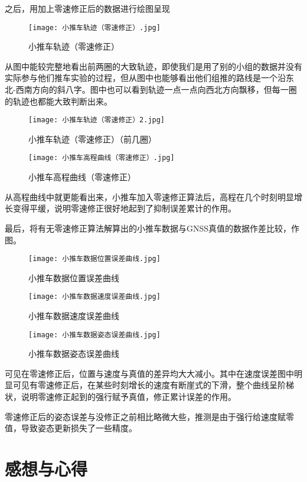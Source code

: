 \documentclass{ctexart}
\begin{document}
之后，用加上零速修正后的数据进行绘图呈现
\begin{figure}[H]
\texttt{[image: 小推车轨迹（零速修正）.jpg]}
\caption{小推车轨迹（零速修正）}
\end{figure}
从图中能较完整地看出前两圈的大致轨迹，即使我们是用了别的小组的数据并没有实际参与他们推车实验的过程，但从图中也能够看出他们组推的路线是一个沿东北-西南方向的斜八字。图中也可以看到轨迹一点一点向西北方向飘移，但每一圈的轨迹也都能大致判断出来。
\begin{figure}[H]
\texttt{[image: 小推车轨迹（零速修正）2.jpg]}
\caption{小推车轨迹（零速修正）（前几圈）}
\end{figure}
\begin{figure}[H]
\texttt{[image: 小推车高程曲线（零速修正）.jpg]}
\caption{小推车高程曲线（零速修正）}
\end{figure}
从高程曲线中就更能看出来，小推车加入零速修正算法后，高程在几个时刻明显增长变得平缓，说明零速修正很好地起到了抑制误差累计的作用。

最后，将有无零速修正算法解算出的小推车数据与GNSS真值的数据作差比较，作图。
\begin{figure}[H]
\texttt{[image: 小推车数据位置误差曲线.jpg]}
\caption{小推车数据位置误差曲线}
\end{figure}
\begin{figure}[H]
\texttt{[image: 小推车数据速度误差曲线.jpg]}
\caption{小推车数据速度误差曲线}
\end{figure}
\begin{figure}[H]
\texttt{[image: 小推车数据姿态误差曲线.jpg]}
\caption{小推车数据姿态误差曲线}
\end{figure}
可见在零速修正后，位置与速度与真值的差异均大大减小。其中在速度误差图中明显可见有零速修正后，在某些时刻增长的速度有断崖式的下滑，整个曲线呈阶梯状，说明零速修正起到的强行赋予真值，修正累计误差的作用。

零速修正后的姿态误差与没修正之前相比略微大些，推测是由于强行给速度赋零值，导致姿态更新损失了一些精度。
\section{感想与心得}
\end{document}
